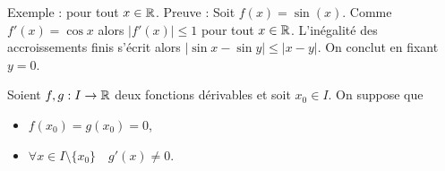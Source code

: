 \documentclass[10pt,class=article,crop=false]{standalone}
\begin{document}
\begin{multicols}{2}
Exemple :  pour tout $x\in\mathbb{R}$.
Preuve : Soit $f(x)=\sin(x)$. Comme $f'(x)=\cos x$ alors $|f'(x)| \le 1$ pour tout $x\in \mathbb{R}$.
L'inégalité des accroissements finis s'écrit alors $|\sin x - \sin y | \le |x-y|$.
On conclut en fixant $y=0$.




\begin{corollaire}
	Soient $f,g : I \to \mathbb{R}$ deux fonctions dérivables et soit $x_0\in I$.
	On suppose que
	\begin{itemize}
		\item $f(x_0)=g(x_0)=0$,
		\item $\forall x \in I\setminus\{x_0\} \quad g'(x)\neq0$.
	\end{itemize}
\end{corollaire}


\end{multicols}
\end{document}
